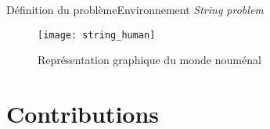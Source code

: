 \documentclass{beamer}
\begin{document}
\begin{frame}{Définition du problème}{Environnement \emph{String problem}}
	\begin{figure}
		\texttt{[image: string\_human]}
		\caption{Représentation graphique du monde nouménal~\citep{Liris-6368-string-problem}}
	\end{figure}
\end{frame}
\section{Contributions}

\end{document}
